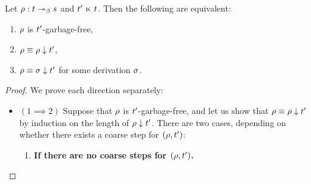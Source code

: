 \begin{proposition}
Let $\rho : t \mathrel{\twoheadrightarrow_\beta} s$ and $t' \mathrel{\ltimes} t$.
Then the following are equivalent:
\begin{enumerate}
\item $\rho$ is $t'$-garbage-free,
\item $\rho \equiv \rho \downarrow t'$,
\item $\rho \equiv \sigma \downarrow t'$ for some derivation $\sigma$.
\end{enumerate}
\end{proposition}
\begin{proof}
We prove each direction separately:
\begin{itemize}
\item $(1 \implies 2)$
  Suppose that $\rho$ is $t'$-garbage-free,
  and let us show that $\rho \equiv \rho \downarrow t'$
  by induction on the length of $\rho \downarrow t'$.
  There are two cases, depending on whether there exists a coarse step for $(\rho,t')$:
  \begin{enumerate}
  \item {\bf If there are no coarse steps for $(\rho,t')$.}


\end{enumerate}
\end{itemize}
\end{proof}

